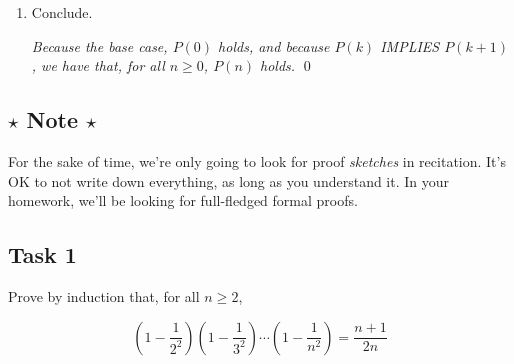 \documentclass[12pt,letterpaper]{article}
\begin{document}
\begin{enumerate}
		\textit{We will now show that $P(k+1)$ holds, namely  $\sum_{i=0}^{k+1} i^2 = \frac{(k+1)((k+1)+1)(2(k+1)+1)}{6}$}.

       	\textit{We know that $\sum_{i=0}^{k+1} i^2 = \left( \sum_{i=0}^{k} i^2 \right)+ (k+1)^2$.}

		\textit{Invoking the inductive hypothesis, we know that $\sum_{i=0}^k i^2 = \frac{k(k+1)(2k+1)}{6}$.}

         \textit{Therefore}
		\begin{align*}
			\sum_{i=0}^{k+1} i^2 &= \left( \sum_{i=0}^{k} i^2 \right)+ (k+1)^2 \\
			&=  \frac{k(k+1)(2k+1)}{6} + (k+1)^2 \\
			&= \frac{k(k+1)(2k+1) + 6(k+1)^2}{6} \\
			&= \frac{(k+1)(k(2k+1)+6(k+1))}{6} \\
			&= \frac{(k+1)(2k^2+k+6k+6)}{6} \\
			&= \frac{(k+1)(2k^2+7k+6)}{6} \\
			&= \frac{(k+1)(k+2)(2k+3)}{6} \\
			&= \frac{(k+1)((k+1)+1)(2(k+1)+1)}{6}
		\end{align*}
		\textit{as needed.}
		
		 \item Conclude.
		 
		 \textit{Because the base case, $P(0)$ holds, and because $P(k)$ IMPLIES $P(k + 1)$, we have that, for all $n \geq 0$, $P(n)$ holds.} \qed
		\end{enumerate}

\subsection*{$\star$ Note $\star$}

For the sake of time, we're only going to look for proof \textit{sketches} in recitation. It's OK to not write down everything, as long as you understand it. In your homework, we'll be looking for full-fledged formal proofs.

	\subsection*{Task 1}

      Prove by induction that, for all $n \geq 2$, 
      
      $$(1 - \frac{1}{2^2})(1 - \frac{1}{3^2}) \cdots (1 - \frac{1}{n^2}) = \frac{n+1}{2n}$$
\begin{mdframed} \vspace{8cm} \end{mdframed}
\end{document}
